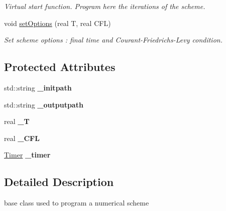 \begin{DoxyCompactItemize}
\begin{DoxyCompactList}\small\item\em Virtual start function. Program here the iterations of the scheme. \item\end{DoxyCompactList}\item 
void \hyperlink{classEngine_a6837cf148e122390a924718435cea117}{setOptions} (real T, real CFL)
\begin{DoxyCompactList}\small\item\em Set scheme options : final time and Courant-\/Friedrichs-\/Levy condition. \item\end{DoxyCompactList}\end{DoxyCompactItemize}
\subsection*{Protected Attributes}
\begin{DoxyCompactItemize}
\item 
\hypertarget{classEngine_ae12535c5ba837c7ea2636f76678132fe}{
std::string {\bfseries \_\-initpath}}
\label{classEngine_ae12535c5ba837c7ea2636f76678132fe}

\item 
\hypertarget{classEngine_adf268ff3f02e5c4a4d9e987c5eb1d925}{
std::string {\bfseries \_\-outputpath}}
\label{classEngine_adf268ff3f02e5c4a4d9e987c5eb1d925}

\item 
\hypertarget{classEngine_ad868f62c35249da60df7aba62151e6dd}{
real {\bfseries \_\-T}}
\label{classEngine_ad868f62c35249da60df7aba62151e6dd}

\item 
\hypertarget{classEngine_a1c37d4f8d2f9c46afeb5356bb496bde4}{
real {\bfseries \_\-CFL}}
\label{classEngine_a1c37d4f8d2f9c46afeb5356bb496bde4}

\item 
\hypertarget{classEngine_a08555133228ffdf91eca97451f777ef2}{
\hyperlink{classTimer}{Timer} {\bfseries \_\-timer}}
\label{classEngine_a08555133228ffdf91eca97451f777ef2}

\end{DoxyCompactItemize}


\subsection{Detailed Description}
base class used to program a numerical scheme 

